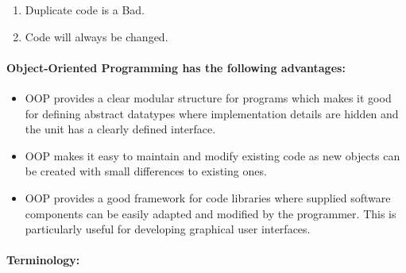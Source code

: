 \documentclass[11pt]{article}
\providecommand{\tightlist}{%
      \setlength{\itemsep}{0pt}\setlength{\parskip}{0pt}}
\begin{document}
\begin{enumerate}
\def\labelenumi{\arabic{enumi}.}
\item
  Duplicate code is a Bad.
\item
  Code will always be changed.
\end{enumerate}

\paragraph{Object-Oriented Programming has the following
advantages:}\label{object-oriented-programming-has-the-following-advantages}

\begin{itemize}
\tightlist
\item
  OOP provides a clear modular structure for programs which makes it
  good for defining abstract datatypes where implementation details are
  hidden and the unit has a clearly defined interface.
\item
  OOP makes it easy to maintain and modify existing code as new objects
  can be created with small differences to existing ones.
\item
  OOP provides a good framework for code libraries where supplied
  software components can be easily adapted and modified by the
  programmer. This is particularly useful for developing graphical user
  interfaces.
\end{itemize}

    \paragraph{Terminology:}\label{terminology}
\end{document}
